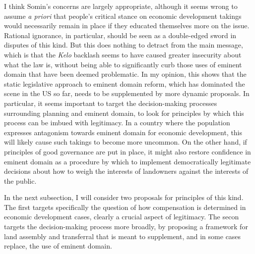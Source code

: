 I think Somin's concerns are largely appropriate, although it seems wrong to assume {\it a priori} that people's critical stance on economic development takings would necessarily remain in place if they educated themselves more on the issue. Rational ignorance, in particular, should be seen as a double-edged sword in disputes of this kind. But this does nothing to detract from the main message, which is that the {\it Kelo} backlash seems to have caused greater insecurity about what the law is, without being able to significantly curb those uses of eminent domain that have been deemed problematic. In my opinion, this shows that the static legislative approach to eminent domain reform, which has dominated the scene in the US so far, needs to be supplemented by more dynamic proposals. In particular, it seems important to target the decision-making processes surrounding planning and eminent domain, to look for principles by which this process can be imbued with legitimacy. In a country where the population expresses antagonism towards eminent domain for economic development, this will likely cause such takings to become more uncommon. On the other hand, if principles of good governance are put in place, it might also restore confidence in eminent domain as a procedure by which to implement democratically legitimate decisions about how to weigh the interests of landowners against the interests of the public. 

In the next subsection, I will consider two proposals for principles of this kind. The first targets specifically the question of how compensation is determined in economic development cases, clearly a crucial aspect of legitimacy. The secon targets the decision-making process more broadly, by proposing a framework for land assembly and transferral that is meant to supplement, and in some cases replace, the use of eminent domain.

